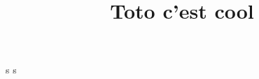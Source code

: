 \documentclass{plasci-secastro}
\title{Toto c'est cool}
\begin{document}
s
\newpage
s
\end{document}
